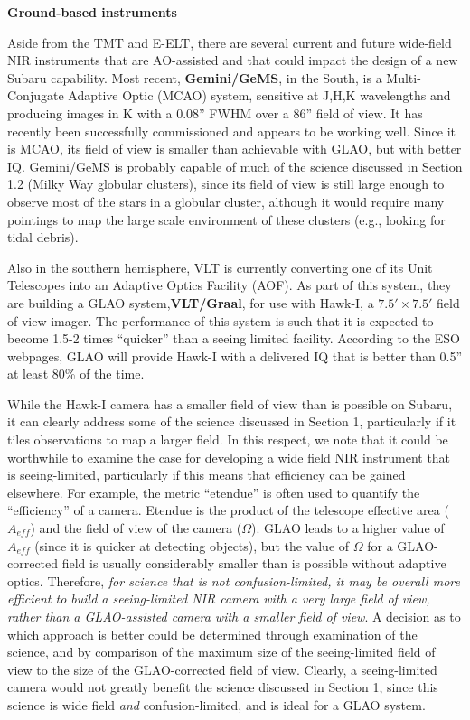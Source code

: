 \medskip
\par\noindent
{\bf Ground-based instruments}

Aside from the TMT and E-ELT, there are several current and future
wide-field NIR instruments that are AO-assisted and that could impact
the design of a new Subaru capability. Most recent, {\bf Gemini/GeMS},
in the South, is a Multi-Conjugate Adaptive Optic (MCAO) system,
sensitive at J,H,K wavelengths and producing images in K with a 0.08''
FWHM over a 86'' field of view. It has recently been successfully
commissioned and appears to be working well. Since it is MCAO, its field
of view is smaller than achievable with GLAO, but with better
IQ. Gemini/GeMS is probably capable of much of the science discussed in
Section 1.2 (Milky Way globular clusters), since its field of view is
still large enough to observe most of the stars in a globular cluster,
although it would require many pointings to map the large scale
environment of these clusters (e.g., looking for tidal debris). 

Also in the southern hemisphere, VLT is currently converting one of its
Unit Telescopes into an Adaptive Optics Facility (AOF). As part of this
system, they are building a GLAO system,{\bf VLT/Graal}, for use with
Hawk-I, a $7.5'\times7.5'$ field of view imager. The performance of this
system is such that it is expected to become 1.5-2 times ``quicker''
than a seeing limited facility. According to the ESO webpages,  GLAO
will provide Hawk-I with a delivered IQ that is better than 0.5'' at
least 80\% of the time.  

While the Hawk-I camera has a smaller field of view than is possible on
Subaru, it can clearly address some of the science discussed in Section
1, particularly if it tiles observations to map a larger field. In this
respect, we note that it could be worthwhile to examine the case for
developing a wide field NIR instrument that is seeing-limited,
particularly if this means that efficiency can be gained elsewhere. For
example, the metric ``etendue'' is often used to quantify the
``efficiency'' of a camera. Etendue is the product of the telescope
effective area ($A_{eff}$) and the field of view of the camera
($\Omega$). GLAO leads to a higher value of $A_{eff}$ (since it is
quicker at detecting objects), but the value of $\Omega$ for a
GLAO-corrected field is usually considerably smaller than is possible
without adaptive optics. Therefore, {\it for science that is not
confusion-limited, it may be overall more efficient to build a
seeing-limited NIR camera with a very large field of view, rather than a
GLAO-assisted camera with a smaller  field of view}. A decision as to
which approach is better could be determined through examination of the
science, and by comparison of the maximum size of the seeing-limited
field of view to the size of the GLAO-corrected field of view. Clearly,
a seeing-limited camera would not greatly benefit the science discussed
in Section 1, since this science is wide field {\it and}
confusion-limited, and is ideal for a GLAO system. 

